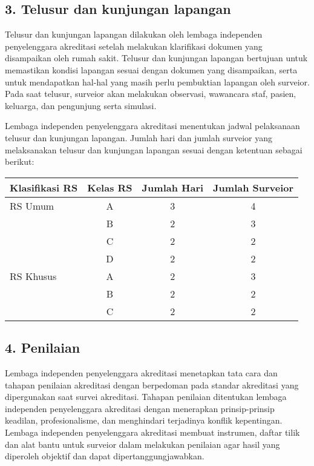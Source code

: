 \documentclass[
]{book}
\begin{document}
\hypertarget{telusur-dan-kunjungan-lapangan}{%
\subsection*{3. Telusur dan kunjungan lapangan}\label{telusur-dan-kunjungan-lapangan}}

Telusur dan kunjungan lapangan dilakukan oleh lembaga independen penyelenggara akreditasi setelah melakukan klarifikasi dokumen yang disampaikan oleh rumah sakit. Telusur dan kunjungan lapangan bertujuan untuk memastikan kondisi lapangan sesuai dengan dokumen yang disampaikan, serta untuk mendapatkan hal-hal yang masih perlu pembuktian lapangan oleh surveior. Pada saat telusur, surveior akan melakukan observasi, wawancara staf, pasien, keluarga, dan pengunjung serta simulasi.

Lembaga independen penyelenggara akreditasi menentukan jadwal pelaksanaan telusur dan kunjungan lapangan. Jumlah hari dan jumlah surveior yang melaksanakan telusur dan kunjungan lapangan sesuai dengan ketentuan sebagai berikut:

\begin{longtable}[]{@{}lccc@{}}
\toprule
Klasifikasi RS & Kelas RS & Jumlah Hari & Jumlah Surveior \\
\midrule
\endhead
RS Umum & A & 3 & 4 \\
& B & 2 & 3 \\
& C & 2 & 2 \\
& D & 2 & 2 \\
RS Khusus & A & 2 & 3 \\
& B & 2 & 2 \\
& C & 2 & 2 \\
\bottomrule
\end{longtable}

\hypertarget{penilaian}{%
\subsection*{4. Penilaian}\label{penilaian}}

Lembaga independen penyelenggara akreditasi menetapkan tata cara dan tahapan penilaian akreditasi dengan berpedoman pada standar akreditasi yang dipergunakan saat survei akreditasi. Tahapan penilaian ditentukan lembaga independen penyelenggara akreditasi dengan menerapkan prinsip-prinsip keadilan, profesionalisme, dan menghindari terjadinya konflik kepentingan. Lembaga independen penyelenggara akreditasi membuat instrumen, daftar tilik dan alat bantu untuk surveior dalam melakukan penilaian agar hasil yang diperoleh objektif dan dapat dipertanggungjawabkan.
\end{document}
